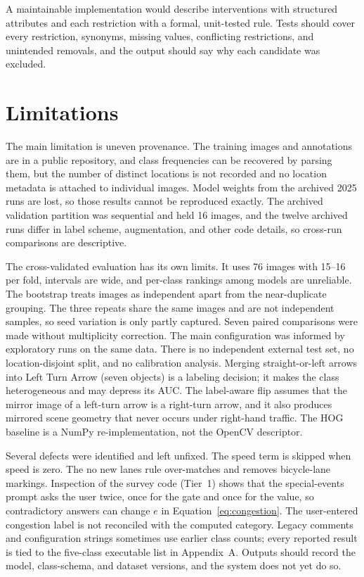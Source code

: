 \documentclass[11pt]{article}
\begin{document}
A maintainable implementation would describe interventions with structured attributes and each restriction with a formal, unit-tested rule. Tests should cover every restriction, synonyms, missing values, conflicting restrictions, and unintended removals, and the output should say why each candidate was excluded.

\section{Limitations}
\label{sec:limitations}
The main limitation is uneven provenance. The training images and annotations are in a public repository, and class frequencies can be recovered by parsing them, but the number of distinct locations is not recorded and no location metadata is attached to individual images. Model weights from the archived 2025 runs are lost, so those results cannot be reproduced exactly. The archived validation partition was sequential and held 16 images, and the twelve archived runs differ in label scheme, augmentation, and other code details, so cross-run comparisons are descriptive.

The cross-validated evaluation has its own limits. It uses 76 images with 15--16 per fold, intervals are wide, and per-class rankings among models are unreliable. The bootstrap treats images as independent apart from the near-duplicate grouping. The three repeats share the same images and are not independent samples, so seed variation is only partly captured. Seven paired comparisons were made without multiplicity correction. The main configuration was informed by exploratory runs on the same data. There is no independent external test set, no location-disjoint split, and no calibration analysis. Merging straight-or-left arrows into Left Turn Arrow (seven objects) is a labeling decision; it makes the class heterogeneous and may depress its AUC. The label-aware flip assumes that the mirror image of a left-turn arrow is a right-turn arrow, and it also produces mirrored scene geometry that never occurs under right-hand traffic. The HOG baseline is a NumPy re-implementation, not the OpenCV descriptor.

Several defects were identified and left unfixed. The speed term is skipped when speed is zero. The no new lanes rule over-matches and removes bicycle-lane markings. Inspection of the survey code (Tier~1) shows that the special-events prompt asks the user twice, once for the gate and once for the value, so contradictory answers can change $e$ in Equation~\ref{eq:congestion}. The user-entered congestion label is not reconciled with the computed category. Legacy comments and configuration strings sometimes use earlier class counts; every reported result is tied to the five-class executable list in Appendix~A. Outputs should record the model, class-schema, and dataset versions, and the system does not yet do so.
\end{document}
